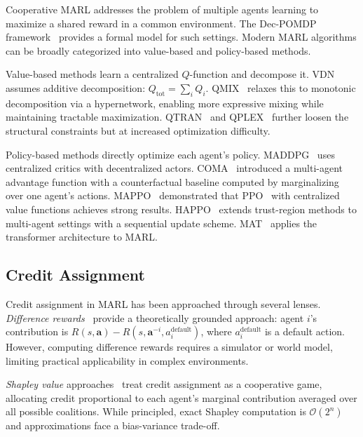 \documentclass[journal]{IEEEtran}
\begin{document}
Cooperative MARL addresses the problem of multiple agents learning to maximize a shared reward in a common environment. The Dec-POMDP framework~\cite{oliehoek2016concise} provides a formal model for such settings. Modern MARL algorithms can be broadly categorized into value-based and policy-based methods.

Value-based methods learn a centralized $Q$-function and decompose it. VDN~\cite{sunehag2018value} assumes additive decomposition: $Q_{\text{tot}} = \sum_i Q_i$. QMIX~\cite{rashid2018qmix} relaxes this to monotonic decomposition via a hypernetwork, enabling more expressive mixing while maintaining tractable maximization. QTRAN~\cite{son2019qtran} and QPLEX~\cite{wang2020qplex} further loosen the structural constraints but at increased optimization difficulty.

Policy-based methods directly optimize each agent's policy. MADDPG~\cite{lowe2017multi} uses centralized critics with decentralized actors. COMA~\cite{foerster2018counterfactual} introduced a multi-agent advantage function with a counterfactual baseline computed by marginalizing over one agent's actions. MAPPO~\cite{yu2022surprising} demonstrated that PPO~\cite{schulman2017proximal} with centralized value functions achieves strong results. HAPPO~\cite{kuba2021trust} extends trust-region methods to multi-agent settings with a sequential update scheme. MAT~\cite{wen2022multi} applies the transformer architecture to MARL.

\subsection{Credit Assignment}

Credit assignment in MARL has been approached through several lenses. \emph{Difference rewards}~\cite{wolpert2002optimal} provide a theoretically grounded approach: agent $i$'s contribution is $R(s, \mathbf{a}) - R(s, \mathbf{a}^{-i}, a_i^{\text{default}})$, where $a_i^{\text{default}}$ is a default action. However, computing difference rewards requires a simulator or world model, limiting practical applicability in complex environments.

\emph{Shapley value} approaches~\cite{li2021shapley} treat credit assignment as a cooperative game, allocating credit proportional to each agent's marginal contribution averaged over all possible coalitions. While principled, exact Shapley computation is $\mathcal{O}(2^n)$ and approximations face a bias-variance trade-off.
\end{document}
